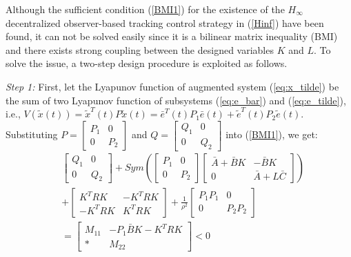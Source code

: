 \documentclass[journal,12pt,onecolumn,draftclsnofoot,]{IEEEtran}
\begin{document}
Although the sufficient condition (\ref{BMI1}) for the existence of the $H_\infty$ decentralized observer-based tracking control strategy in (\ref{Hinf}) have been found, it can not be solved easily since it is a bilinear matrix inequality (BMI) and there exists strong coupling between the designed variables $K$ and $L$. To solve the issue, a two-step design procedure is exploited as follows.

\textit{Step 1:} First, let the Lyapunov function of augmented system (\ref{eq:x_tilde}) be the sum of two Lyapunov function of subsystems (\ref{eq:e_bar}) and (\ref{eq:e_tilde}), i.e., $V(\tilde{x}(t))=\tilde{x}^T(t)P\tilde{x}(t)=\bar{e}^T(t)P_1\bar{e}(t)+\tilde{e}^T(t)P_2\tilde{e}(t)$. Substituting $P=\begin{bmatrix}
    P_1 & 0 \\ 0 & P_2
\end{bmatrix}$ and $Q=\begin{bmatrix}
    Q_1 & 0 \\ 0 & Q_2
\end{bmatrix}$ into (\ref{BMI1}), we get:
\begin{equation} \label{eq:M}
    \begin{split}
        & \begin{bmatrix}
            Q_1 & 0 \\ 0 & Q_2
        \end{bmatrix} + Sym(\begin{bmatrix}
            P_1 & 0 \\ 0 & P_2
        \end{bmatrix}\begin{bmatrix}
            \bar{A}+\bar{B}K & -\bar{B}K \\ 0 & \bar{A}+L\bar{C}
        \end{bmatrix})  \\
        & + \begin{bmatrix}
            K^TRK & -K^TRK \\ -K^TRK & K^TRK
        \end{bmatrix} + \frac{1}{\rho^2}\begin{bmatrix}
            P_1P_1 & 0 \\ 0 & P_2P_2
        \end{bmatrix} \\
        & = \begin{bmatrix}
            M_{11} & -P_1\bar{B}K - K^TRK \\ * & M_{22}
        \end{bmatrix} < 0
    \end{split}
\end{equation}
\end{document}
